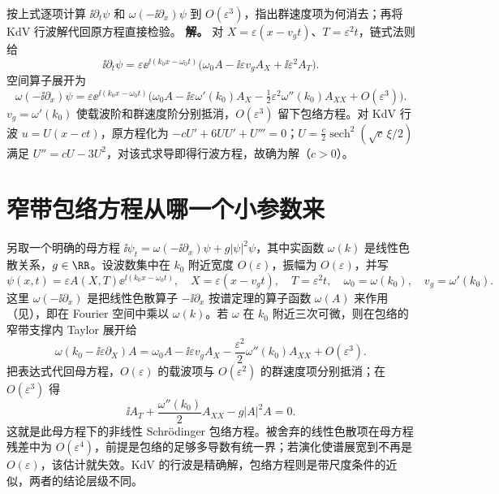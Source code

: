 \par
\begin{workedexample}
按上式逐项计算 \(\ii\partial_t\psi\) 和 \(\omega(-\ii\partial_x)\psi\) 到 \(O(\varepsilon^3)\)，指出群速度项为何消去；再将 KdV 行波解代回原方程直接检验。
\textbf{解。} 对 \(X=\varepsilon(x-v_gt)\)、\(T=\varepsilon^2t\)，链式法则给
\[
\ii\partial_t\psi=\varepsilon \ee^{\ii(k_0x-\omega_0t)}
\bigl(\omega_0A-\ii\varepsilon v_gA_X+\ii\varepsilon^2A_T\bigr).
\]
空间算子展开为
\[
\omega(-\ii\partial_x)\psi=\varepsilon \ee^{\ii(k_0x-\omega_0t)}
\bigl(\omega_0A-\ii\varepsilon\omega'(k_0)A_X-\tfrac12\varepsilon^2\omega''(k_0)A_{XX}+O(\varepsilon^3)\bigr).
\]
\(v_g=\omega'(k_0)\) 使载波阶和群速度阶分别抵消，\(O(\varepsilon^3)\) 留下包络方程。对 KdV 行波 \(u=U(x-ct)\)，原方程化为 \(-cU'+6UU'+U'''=0\)；\(U=\frac c2\operatorname{sech}^2(\sqrt c\,\xi/2)\) 满足 \(U''=cU-3U^2\)，对该式求导即得行波方程，故确为解（\(c>0\)）。
\end{workedexample}
\par
\section{窄带包络方程从哪一个小参数来}

另取一个明确的母方程 \(\ii\psi_t=\omega(-\ii\partial_x)\psi+g|\psi|^2\psi\)，其中实函数 \(\omega(k)\) 是线性色散关系，\(g\in\RR\)。设波数集中在 \(k_0\) 附近宽度 \(O(\varepsilon)\)，振幅为 \(O(\varepsilon)\)，并写
\[
\psi(x,t)=\varepsilon A(X,T)\ee^{\ii(k_0x-\omega_0t)},
\quad X=\varepsilon(x-v_gt),\quad T=\varepsilon^2t,
\quad \omega_0=\omega(k_0),\quad v_g=\omega'(k_0).
\]
这里 \(\omega(-\ii\partial_x)\) 是把线性色散算子 \(-\ii\partial_x\) 按谱定理的算子函数 \(\omega(A)\) 来作用（见），即在 Fourier 空间中乘以 \(\omega(k)\)。若 \(\omega\) 在 \(k_0\) 附近三次可微，则在包络的窄带支撑内 Taylor 展开给
\[
\omega(k_0-\ii\varepsilon\partial_X)A
=\omega_0A-\ii\varepsilon v_gA_X
-\frac{\varepsilon^2}{2}\omega''(k_0)A_{XX}+O(\varepsilon^3).
\]
把表达式代回母方程，\(O(\varepsilon)\) 的载波项与 \(O(\varepsilon^2)\) 的群速度项分别抵消；在 \(O(\varepsilon^3)\) 得
\[
\ii A_T+\frac{\omega''(k_0)}2A_{XX}-g|A|^2A=0.
\]
这就是此母方程下的非线性 Schrödinger 包络方程。被舍弃的线性色散项在母方程残差中为 \(O(\varepsilon^4)\)，前提是包络的足够多导数有统一界；若演化使谱展宽到不再是 \(O(\varepsilon)\)，该估计就失效。KdV 的行波是精确解，包络方程则是带尺度条件的近似，两者的结论层级不同。

